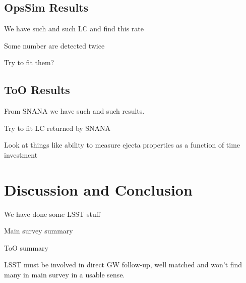 \subsection{OpsSim Results}
\label{sec:ch6_opssim_results}
We have such and such LC and find this rate

Some number are detected twice

Try to fit them?

\subsection{ToO Results}
\label{sec:ch6_too_results}
From SNANA we have such and such results.

Try to fit LC returned by SNANA

Look at things like ability to measure ejecta properties as a function of time investment

\section{Discussion and Conclusion}
\label{sec:ch6_conc}
We have done some LSST stuff 

Main survey summary

ToO summary

LSST must be involved in direct GW follow-up, well matched and won't find many in main survey in a usable sense.

